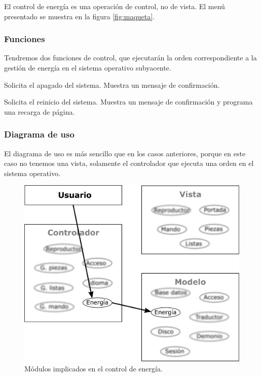 El control de energía es una operación de control, no de vista. El menú presentado se muestra en la figura \ref{fig:maqueta}.

\subsubsection{Funciones}

Tendremos dos funciones de control, que ejecutarán la orden correspondiente a la gestión de energía en el sistema operativo subyacente.

\begin{description}[style=nextline]
	\item[shutdown ()]
	Solicita el apagado del sistema. Muestra un mensaje de confirmación.
	
	\item[reboot ()]
	Solicita el reinicio del sistema. Muestra un mensaje de confirmación y programa una recarga de página.
\end{description}

\subsubsection{Diagrama de uso}

El diagrama de uso es más sencillo que en los casos anteriores, porque en este caso no tenemos una vista, solamente el controlador que ejecuta una orden en el sistema operativo.

\smallskip

\begin{figure}[H]
	\noindent \begin{centering}
		\includegraphics[width=\linewidth/2]{capitulo4/mvc_energia}
		\par\end{centering}
	\smallskip
	\caption{\label{fig:mvc_energia} Módulos implicados en el control de energía.}
\end{figure} 

